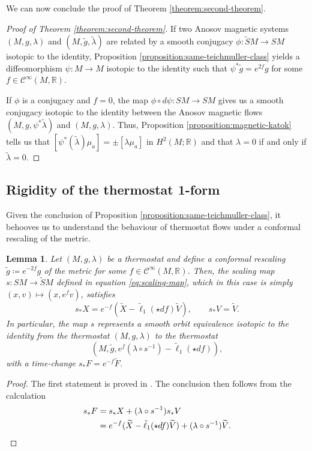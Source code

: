 \documentclass[reqno,12pt,letterpaper]{amsart}
\newtheorem{lemma}[proposition]{Lemma}
\theoremstyle{definition}
\theoremstyle{remark}
\theoremstyle{definition}
\numberwithin{equation}{section}
\newcommand{\R}{\mathbb{R}}
\begin{document}
We can now conclude the proof of Theorem \ref{theorem:second-theorem}.

\begin{proof}[Proof of Theorem \ref{theorem:second-theorem}]
If two Anosov magnetic systems $(M, g, \lambda)$ and $(M, \tilde{g}, \tilde{\lambda})$ are related by a smooth conjugacy  $\phi :\widetilde{S}M\to SM$ isotopic to the identity, Proposition \ref{proposition:same-teichmuller-class} yields a diffeomorphism $\psi:M\to M$ isotopic to the identity such that $\psi^*\tilde{g}=e^{2f}g$ for some $f\in \mathcal{C}^\infty(M, \R)$. 

If $\phi$ is a conjugacy and $f=0$, the map $\phi \circ d\psi : SM\to SM$ gives us a smooth conjugacy isotopic to the identity between the Anosov magnetic flows $(M, g, \psi^* \tilde{\lambda})$ and $(M, g, \lambda)$. Thus, Proposition \ref{proposition:magnetic-katok} tells us that $[\psi^*(\tilde{\lambda})\mu_a]=\pm [\lambda\mu_a]$ in $H^2(M;\R)$ and that $\lambda=0$ if and only if $\tilde{\lambda}=0$. 
\end{proof}

\subsection{Rigidity of the thermostat 1-form}  Given the conclusion of Proposition \ref{proposition:same-teichmuller-class}, it behooves us to understand the behaviour of thermostat flows under a conformal rescaling of the metric. 

\begin{lemma}\label{lemma:rescaling}
Let $(M, g, \lambda)$ be a thermostat and define a conformal rescaling $\tilde{g}\coloneqq e^{-2f}g$ of the metric for some $f\in \mathcal{C}^\infty(M,\R)$. Then, the scaling map $s: SM\to \widetilde{S}M$ defined in equation \eqref{eq:scaling-map}, which in this case is simply $(x,v)\mapsto (x, e^fv)$, satisfies
$$s_*X=e^{-f}(\widetilde{X}-\tilde{\ell}_1(\star df)\widetilde{V}), \qquad s_*V= \widetilde{V}.$$
In particular, the map $s$ represents a smooth orbit equivalence isotopic to the identity from the thermostat $(M, g, \lambda)$ to the thermostat
\begin{equation}\label{eq:new-thermostat}
(M, \tilde{g}, e^f(\lambda\circ s^{-1})-\tilde{\ell}_1(\star df)),
\end{equation}
with a time-change  $s_*F = e^{-f}\widetilde{F}$. 
\end{lemma}
\begin{proof} The first statement is proved in \cite[Lemma B.1]{cekic25b}. The conclusion then follows from the calculation 
\begin{align*}
s_*F &=s_*X+(\lambda\circ s^{-1}) s_*V\\
&=e^{-f}(\widetilde{X}-\tilde{\ell}_1(\star df)\widetilde{V})+(\lambda\circ s^{-1})\widetilde{V}.\qedhere\\
\end{align*}
\end{proof}
\end{document}
